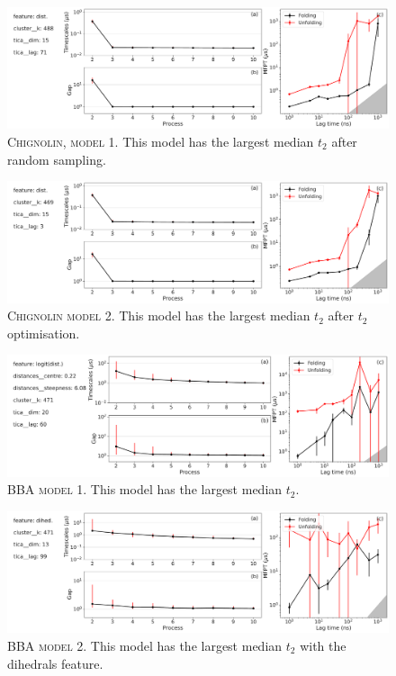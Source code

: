\documentclass{article}
\begin{document}
\begin{figure}
    \centering
    \includegraphics[width=\columnwidth]{SI_figures/CLN_52_SI-1.pdf}
    \caption{\textsc{Chignolin, model 1.}  This model has the largest median $t_{2}$ after random sampling.}
    \label{si_fig:CLN_52_1}
\end{figure}


\begin{figure}
    \centering
    \includegraphics[width=\columnwidth]{SI_figures/CLN_218_SI-1.pdf}
    \caption{\textsc{Chignolin model 2.} This model has the largest median $t_{2}$ after $t_{2}$ optimisation.}
    \label{si_fig:CLN_218_1}
\end{figure}


\begin{figure}
    \centering
    \includegraphics[width=\columnwidth]{SI_figures/BBA_24_SI-1.pdf}
    \caption{\textsc{BBA model 1.}  This model has the largest median $t_{2}$.}
    \label{si_fig:BBA_24_1}
\end{figure}


\begin{figure}
    \centering
    \includegraphics[width=\columnwidth]{SI_figures/BBA_6_SI-1.pdf}
    \caption{\textsc{BBA model 2.} This model has the largest median $t_{2}$ with the dihedrals feature.}
    \label{si_fig:BBA_6_1}
\end{figure}
\end{document}
